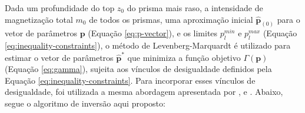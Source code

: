 Dada um profundidade do top $z_{0}$ do prisma mais raso, a intensidade de magnetização total $m_{0}$ de todos os prismas, uma aproximação inicial $\hat{\mathbf{p}}_{(0)}$ para o vetor de parâmetros $\mathbf{p}$ (Equação \ref{eq:p-vector}), e os limites 
$p_{l}^{min}$ e $p_{l}^{max}$ (Equação \ref{eq:inequality-constraints}), o método de Levenberg-Marquardt \cite[e.g., ][ p. 624]{seber_wild2003} é utilizado para estimar o vetor de parâmetros $\hat{\mathbf{p}}^{\ast}$ que minimiza a função objetivo $\Gamma (\mathbf{p})$ (Equação \ref{eq:gamma}), sujeita aos vínculos de desigualdade definidos pela Equação \ref{eq:inequality-constraints}.
Para incorporar esses vínculos de desigualdade, foi utilizada a mesma abordagem apresentada por \cite{barbosa_etal1999}, \cite{oliveirajr_etal2011} e \cite{oliveirajr_barbosa2013}.
Abaixo, segue o algoritmo de inversão aqui proposto:

